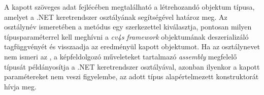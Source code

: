 A kapott szöveges adat fejlécében megtalálható a létrehozandó objektum típusa, amelyet a .NET keretrendszer  osztályának segítségével határoz meg. Az osztálynév ismeretében a  metódus egy  szerkezettel kiválasztja, pontosan milyen típusparaméterrel kell meghívni a \emph{cv4s framework}  objektumának deszerializáló tagfüggvényét és visszaadja az eredményül kapott objektumot. Ha az osztálynevet nem ismeri az , a képfeldolgozó műveleteket tartalmazó \emph{assembly} megfelelő típusát példányosítja a .NET keretrendszer  osztályával, azonban ilyenkor a kapott paramétereket nem veszi figyelembe, az adott  típus alapértelmezett konstruktorát hívja meg.




%

